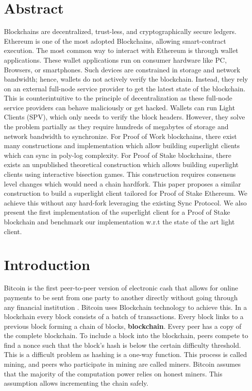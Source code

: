 \documentclass[a4paper,11pt,oneside]{article}
\theoremstyle{definition}
\begin{document}
  \section*{Abstract}
    Blockchains are decentralized, trust-less, and cryptographically secure ledgers. Ethereum is one of the most adopted Blockchains, allowing smart-contract execution. The most common way to interact with Ethereum is through wallet applications. These wallet applications run on consumer hardware like PC, Browsers, or smartphones. Such devices are constrained in storage and network bandwidth; hence, wallets do not actively verify the blockchain. Instead, they rely on an external full-node service provider to get the latest state of the blockchain. This is counterintuitive to the principle of decentralization as these full-node service providers can behave maliciously or get hacked. Wallets can run Light Clients (SPV), which only needs to verify the block headers. However, they solve the problem partially as they require hundreds of megabytes of storage and network bandwidth to synchronize\cite{LightClientRequirements}. For Proof of Work blockchains, there exist many constructions and implementation\cite{NiPoPoW,PoPoW} which allow building superlight clients which can sync in poly-log complexity. For Proof of Stake blockchains, there exists an unpublished theoretical construction\cite{PoPoS} which allows building superlight clients using interactive bisection games. This construction requires consensus level changes which would need a chain hardfork. This paper proposes a similar construction to build a superlight client tailored for Proof of Stake Ethereum. We achieve this without any hard-fork leveraging the existing Sync Protocol. We also present the first implementation of the superlight client for a Proof of Stake blockchain and benchmark our implementation w.r.t the state of the art light client. 

  \newpage
  \tableofcontents

  \clearpage

  \section{Introduction}
 Bitcoin is the first peer-to-peer version of electronic cash that allows for online payments to be sent from one party to another directly without going through any financial institution \cite{Bitcoin}. Bitcoin uses Blockchain technology to achieve this. In a blockchain every block consists of a batch of transactions. Every block links to a previous block forming a chain of blocks, \textbf{blockchain}. Every peer has a copy of the complete blockchain. To include a block into the blockchain, peers compete to find a nonce such that the block's hash is below the certain difficulty threshold. This is a difficult problem as hashing is a one-way function. This process is called mining, and peers who participate in mining are called miners. Bitcoin assumes that the majority of the computation power relies on honest miners. This assumption allows incrementing the chain safely. 
  
\end{document}
